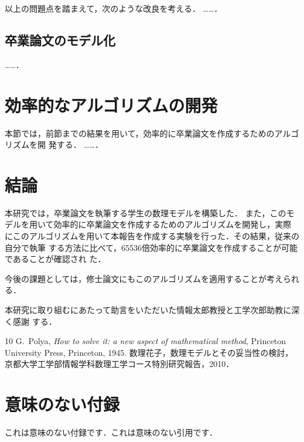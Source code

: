 \documentclass[dvipdfmx]{ampbt}
\begin{document}
  以上の問題点を踏まえて，次のような改良を考える．
  ……．

  \subsection{卒業論文のモデル化}
  ……．

  \section{効率的なアルゴリズムの開発}
  本節では，前節までの結果を用いて，効率的に卒業論文を作成するためのアルゴリズムを開
  発する．
  ……．

  \section{結論}
  本研究では，卒業論文を執筆する学生の数理モデルを構築した．
  また，このモデルを用いて効率的に卒業論文を作成するためのアルゴリズムを開発し，実際
  にこのアルゴリズムを用いて本報告を作成する実験を行った．その結果，従来の自分で執筆
  する方法に比べて，65536倍効率的に卒業論文を作成することが可能であることが確認され
  た．

  今後の課題としては，修士論文にもこのアルゴリズムを適用することが考えられる．

  \acknowledgment
  本研究に取り組むにあたって助言をいただいた情報太郎教授と工学次郎助教に深く感謝
  する．

  \begin{thebibliography}{10}
    G.~Polya, \textit{How to solve it: a new aspect of mathematical method},
    Princeton University Press, Princeton, 1945.
    数理花子，数理モデルとその妥当性の検討，
    京都大学工学部情報学科数理工学コース特別研究報告，2010．
  \end{thebibliography}

  \appendix

  \section{意味のない付録}
  これは意味のない付録です．これは意味のない引用です\cite{polya1945}．
\end{document}

